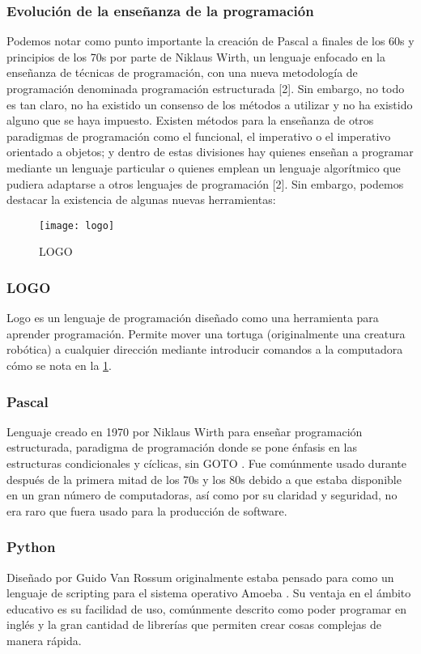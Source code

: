 \subsubsection{Evolución de la enseñanza de la programación}
Podemos notar como punto importante la creación de Pascal a finales de los 60s y principios de los 70s por parte de Niklaus Wirth, un lenguaje enfocado en la enseñanza de técnicas de programación, con una nueva metodología de programación denominada programación estructurada [2]. Sin embargo, no todo es tan claro, no ha existido un consenso de los métodos a utilizar y no ha existido alguno que se haya impuesto. 
Existen métodos para la enseñanza de otros paradigmas de programación como el funcional, el imperativo o el imperativo orientado a objetos; y dentro de estas divisiones hay quienes enseñan a programar mediante un lenguaje particular o quienes emplean un lenguaje algorítmico que pudiera adaptarse a otros lenguajes de programación [2].
Sin embargo, podemos destacar la existencia de algunas nuevas herramientas:

\begin{figure}[h]
    \caption{LOGO}
    \centering
    \texttt{[image: logo]}
    \label{fig:logo_scrn}
\end{figure}

\subsubsection{LOGO}
Logo es un lenguaje de programación diseñado como una herramienta para aprender programación. 
Permite mover una tortuga (originalmente una creatura robótica) a cualquier dirección 
mediante introducir comandos a la computadora \cite{logo_history} cómo se nota en la \ref{fig:logo_scrn}.

\subsubsection{Pascal}
Lenguaje creado en 1970 por Niklaus Wirth para enseñar programación estructurada, 
paradigma de programación donde se pone énfasis en las 
estructuras condicionales y cíclicas, sin GOTO \cite{pascal_history}. 
Fue comúnmente usado durante después de la primera mitad de los 70s y los 80s 
debido a que estaba disponible en un gran número de computadoras, 
así como por su claridad y seguridad, no era raro que fuera usado para la 
producción de software.

\subsubsection{Python}
Diseñado por Guido Van Rossum originalmente estaba pensado 
para como un lenguaje de scripting para el sistema operativo Amoeba \cite{python_history}. 
Su ventaja en el ámbito educativo es su facilidad de uso, comúnmente descrito 
como poder programar en inglés y la gran cantidad de librerías que permiten 
crear cosas complejas de manera rápida.

